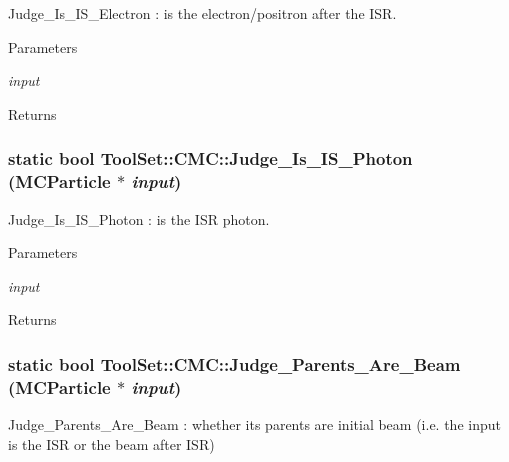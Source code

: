 Judge\_\-Is\_\-IS\_\-Electron : is the electron/positron after the ISR. 
\begin{DoxyParams}{Parameters}
\item[{\em input}]\end{DoxyParams}
\begin{DoxyReturn}{Returns}

\end{DoxyReturn}
\hypertarget{classToolSet_1_1CMC_a688d2854fa645f4c3adad5013f4c9ba2}{
\subsubsection[{Judge\_\-Is\_\-IS\_\-Photon}]{\setlength{\rightskip}{0pt plus 5cm}static bool ToolSet::CMC::Judge\_\-Is\_\-IS\_\-Photon (MCParticle $\ast$ {\em input})}}
\label{classToolSet_1_1CMC_a688d2854fa645f4c3adad5013f4c9ba2}


Judge\_\-Is\_\-IS\_\-Photon : is the ISR photon. 
\begin{DoxyParams}{Parameters}
\item[{\em input}]\end{DoxyParams}
\begin{DoxyReturn}{Returns}

\end{DoxyReturn}
\hypertarget{classToolSet_1_1CMC_a5ccf3aedd3c942ac6644748abaaf70fe}{
\subsubsection[{Judge\_\-Parents\_\-Are\_\-Beam}]{\setlength{\rightskip}{0pt plus 5cm}static bool ToolSet::CMC::Judge\_\-Parents\_\-Are\_\-Beam (MCParticle $\ast$ {\em input})}}
\label{classToolSet_1_1CMC_a5ccf3aedd3c942ac6644748abaaf70fe}


Judge\_\-Parents\_\-Are\_\-Beam : whether its parents are initial beam (i.e. the input is the ISR or the beam after ISR)


